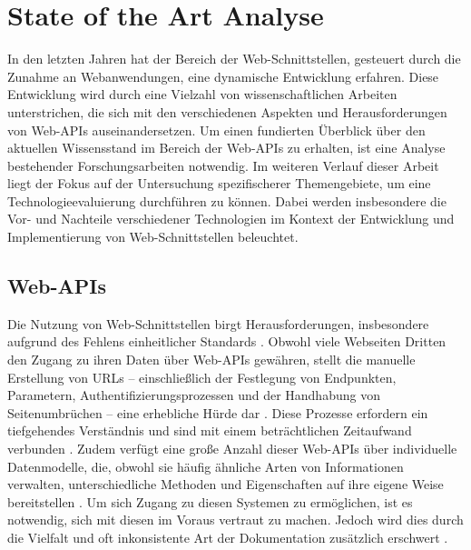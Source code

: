 \documentclass[draft,final]{vutinfth} %
\begin{document}
\chapter{State of the Art Analyse}
\label{sec:stateOfTheArt}

In den letzten Jahren hat der Bereich der Web-Schnittstellen, gesteuert durch die Zunahme an Webanwendungen, eine dynamische Entwicklung erfahren. Diese Entwicklung wird durch eine Vielzahl von wissenschaftlichen Arbeiten unterstrichen, die sich mit den verschiedenen Aspekten und Herausforderungen von Web-APIs auseinandersetzen. 
Um einen fundierten Überblick über den aktuellen Wissensstand im Bereich der Web-APIs zu erhalten, ist eine Analyse bestehender Forschungsarbeiten notwendig.  
Im weiteren Verlauf dieser Arbeit liegt der Fokus auf der Untersuchung spezifischerer Themengebiete, um eine Technologieevaluierung durchführen zu können. 
Dabei werden insbesondere die Vor- und Nachteile verschiedener Technologien im Kontext der Entwicklung und Implementierung von Web-Schnittstellen beleuchtet.


\section{Web-APIs}

Die Nutzung von Web-Schnittstellen birgt Herausforderungen, insbesondere aufgrund des Fehlens einheitlicher Standards \cite{Alrashed:2021:StandardizingAPIs}. 
Obwohl viele Webseiten Dritten den Zugang zu ihren Daten über Web-APIs gewähren, stellt die manuelle Erstellung von URLs -- einschließlich der Festlegung von Endpunkten, Parametern, Authentifizierungsprozessen und der Handhabung von Seitenumbrüchen -- eine erhebliche Hürde dar 
\cite{Alrashed:2021:StandardizingAPIs, Maleshkova:2010:InvestigationWebAPIs}. 
Diese Prozesse erfordern ein tiefgehendes Verständnis und sind mit einem beträchtlichen Zeitaufwand verbunden \cite{Alrashed:2021:StandardizingAPIs}. 
Zudem verfügt eine große Anzahl dieser Web-APIs über individuelle Datenmodelle, die, obwohl sie häufig ähnliche Arten von Informationen verwalten, unterschiedliche Methoden und Eigenschaften auf ihre eigene Weise bereitstellen \cite{Alrashed:2021:StandardizingAPIs}.
Um sich Zugang zu diesen Systemen zu ermöglichen, ist es notwendig, sich mit diesen im Voraus vertraut zu machen. 
Jedoch wird dies durch die Vielfalt und oft inkonsistente Art der Dokumentation zusätzlich erschwert \cite{Maleshkova:2010:InvestigationWebAPIs}.
\end{document}
